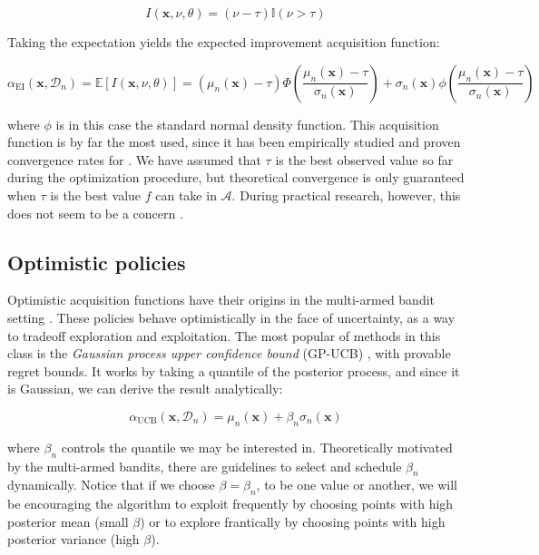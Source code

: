 \documentclass[10pt,a4paper,twoside]{book}
\begin{document}
\begin{equation}
I(\boldsymbol{x}, \nu, \theta) = (\nu - \tau)\mathbb{I}(\nu > \tau)
\end{equation}

Taking the expectation yields the expected improvement acquisition function:

\begin{equation}
\alpha_{\mathrm{EI}}(\boldsymbol{x}, \mathcal{D}_n) = \mathbb{E}\left[I(\boldsymbol{x}, \nu, \theta)\right] = (\mu_n(\boldsymbol{x}) - \tau)\Phi\left(\dfrac{\mu_n(\boldsymbol{x}) - \tau}{\sigma_n(\boldsymbol{x})}  \right) + \sigma_n(\boldsymbol{x})\phi\left( \dfrac{\mu_n(\boldsymbol{x}) - \tau}{\sigma_n(\boldsymbol{x})} \right)
\end{equation}

where $\phi$ is in this case the standard normal density function. This acquisition function is by far the most used, since it has been empirically studied \cite{Jones2001} and proven convergence rates for \cite{Bull2011}. We have assumed that $\tau$ is the best observed value so far during the optimization procedure, but theoretical convergence is only guaranteed when $\tau$ is the best value $f$ can take in $\mathcal{A}$. During practical research, however, this does not seem to be a concern \cite{Snoek2012}.

\subsection{Optimistic policies}

Optimistic acquisition functions have their origins in the multi-armed bandit setting \cite{Lai1985}. These policies behave optimistically in the face of uncertainty, as a way to tradeoff exploration and exploitation. The most popular of methods in this class is the \textit{Gaussian process upper confidence bound} (GP-UCB) \cite{Srinivas2010}, with provable regret bounds. It works by taking a quantile of the posterior process, and since it is Gaussian, we can derive the result analytically:

\begin{equation}
\alpha_{\mathrm{UCB}}(\boldsymbol{x}, \mathcal{D}_n) = \mu_n(\boldsymbol{x}) + \beta_n\sigma_n(\boldsymbol{x})
\end{equation}

where $\beta_n$ controls the quantile we may be interested in. Theoretically motivated by the multi-armed bandits, there are guidelines to select and schedule $\beta_n$ dynamically. Notice that if we choose $\beta = \beta_n$, to be one value or another, we will be encouraging the algorithm to exploit frequently by choosing points with high posterior mean (small $\beta$) or to explore frantically by choosing points with high posterior variance (high $\beta$).
\end{document}
